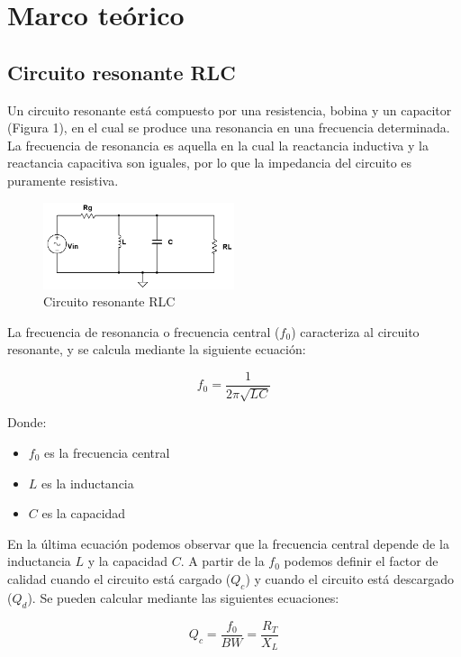 \section{Marco teórico}

\subsection{Circuito resonante RLC}

Un circuito resonante está compuesto por una resistencia, bobina y un capacitor (Figura 1), en el cual se produce una resonancia en una frecuencia determinada. La frecuencia de resonancia es aquella en 
la cual la reactancia inductiva y la reactancia capacitiva son iguales, por lo que la impedancia del circuito es puramente resistiva. 

\begin{figure}[h]
    \centering
    \includegraphics[width=0.5\textwidth]{Imagenes/circuito_resonante.png}
    \caption{Circuito resonante RLC}
    \label{fig:circuito_resonante}
\end{figure}

La frecuencia de resonancia o frecuencia central ($f_0$) caracteriza al circuito resonante, y se calcula mediante la siguiente ecuación:

\begin{equation}
    f_0 = \frac{1}{2\pi \sqrt{LC}}
\end{equation}

Donde: 
\begin{itemize}
    \item $f_0$ es la frecuencia central
    \item $L$ es la inductancia
    \item $C$ es la capacidad
\end{itemize}

En la última ecuación podemos observar que la frecuencia central depende de la inductancia $L$ y la capacidad $C$. 
A partir de la $f_0$ podemos definir el factor de calidad cuando el circuito está cargado ($Q_c$) y cuando el circuito está descargado ($Q_d$). 
Se pueden calcular mediante las siguientes ecuaciones:

\begin{equation}
    Q_c = \frac{f_0}{BW} = \frac{R_T}{X_L}
\end{equation}


